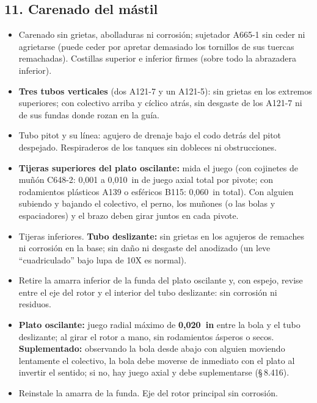 \subsection*{11. Carenado del mástil}
\begin{itemize}
\item Carenado sin grietas, abolladuras ni corrosión; sujetador A665-1 sin ceder ni agrietarse (puede ceder por apretar demasiado los tornillos de sus tuercas remachadas). Costillas superior e inferior firmes (sobre todo la abrazadera inferior).
\item \textbf{Tres tubos verticales} (dos A121-7 y un A121-5): sin grietas en los extremos superiores; con colectivo arriba y cíclico atrás, sin desgaste de los A121-7 ni de sus fundas donde rozan en la guía.
\item Tubo pitot y su línea: agujero de drenaje bajo el codo detrás del pitot despejado. Respiraderos de los tanques sin dobleces ni obstrucciones.
\item \textbf{Tijeras superiores del plato oscilante:} mida el juego (con cojinetes de muñón C648-2: 0,001 a 0,010~in de juego axial total por pivote; con rodamientos plásticos A139 o esféricos B115: 0,060~in total). Con alguien subiendo y bajando el colectivo, el perno, los muñones (o las bolas y espaciadores) y el brazo deben girar juntos en cada pivote.
\item Tijeras inferiores. \textbf{Tubo deslizante:} sin grietas en los agujeros de remaches ni corrosión en la base; sin daño ni desgaste del anodizado (un leve ``cuadriculado'' bajo lupa de 10X es normal).
\item Retire la amarra inferior de la funda del plato oscilante y, con espejo, revise entre el eje del rotor y el interior del tubo deslizante: sin corrosión ni residuos.
\item \textbf{Plato oscilante:} juego radial máximo de \textbf{0,020~in} entre la bola y el tubo deslizante; al girar el rotor a mano, sin rodamientos ásperos o secos. \textbf{Suplementado:} observando la bola desde abajo con alguien moviendo lentamente el colectivo, la bola debe moverse de inmediato con el plato al invertir el sentido; si no, hay juego axial y debe suplementarse (\S\,8.416).
\item Reinstale la amarra de la funda. Eje del rotor principal sin corrosión.
\end{itemize}

